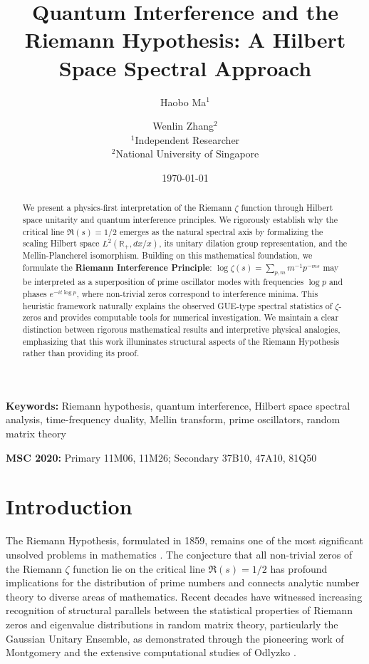 \documentclass[12pt]{article}
\title{Quantum Interference and the Riemann Hypothesis: A Hilbert Space Spectral Approach}
\author{Haobo Ma$^1$ \and Wenlin Zhang$^2$\\
\small $^1$Independent Researcher\\
\small $^2$National University of Singapore}
\date{\today}
\theoremstyle{plain}
\theoremstyle{definition}
\begin{document}
\maketitle

\begin{abstract}
We present a physics-first interpretation of the Riemann $\zeta$ function through Hilbert space unitarity and quantum interference principles. We rigorously establish why the critical line $\Re(s) = 1/2$ emerges as the natural spectral axis by formalizing the scaling Hilbert space $L^2(\mathbb{R}_+, dx/x)$, its unitary dilation group representation, and the Mellin-Plancherel isomorphism. Building on this mathematical foundation, we formulate the \textbf{Riemann Interference Principle}: $\log\zeta(s) = \sum_{p,m} m^{-1}p^{-ms}$ may be interpreted as a superposition of prime oscillator modes with frequencies $\log p$ and phases $e^{-it\log p}$, where non-trivial zeros correspond to interference minima. This heuristic framework naturally explains the observed GUE-type spectral statistics of $\zeta$-zeros and provides computable tools for numerical investigation. We maintain a clear distinction between rigorous mathematical results and interpretive physical analogies, emphasizing that this work illuminates structural aspects of the Riemann Hypothesis rather than providing its proof.
\end{abstract}

\noindent\textbf{Keywords:} Riemann hypothesis, quantum interference, Hilbert space spectral analysis, time-frequency duality, Mellin transform, prime oscillators, random matrix theory

\noindent\textbf{MSC 2020:} Primary 11M06, 11M26; Secondary 37B10, 47A10, 81Q50

\section{Introduction}

The Riemann Hypothesis, formulated in 1859, remains one of the most significant unsolved problems in mathematics \cite{edwards1974,conrey2003}. The conjecture that all non-trivial zeros of the Riemann $\zeta$ function lie on the critical line $\Re(s) = 1/2$ has profound implications for the distribution of prime numbers and connects analytic number theory to diverse areas of mathematics. Recent decades have witnessed increasing recognition of structural parallels between the statistical properties of Riemann zeros and eigenvalue distributions in random matrix theory, particularly the Gaussian Unitary Ensemble, as demonstrated through the pioneering work of Montgomery \cite{montgomery1973} and the extensive computational studies of Odlyzko \cite{odlyzko1987}.
\end{document}
